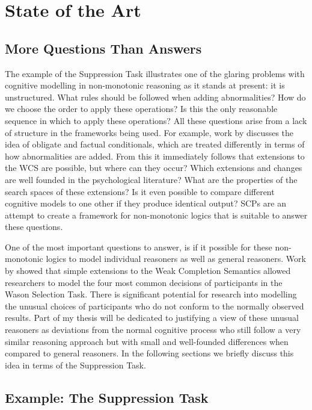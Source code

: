 \documentclass{article}
\begin{document}
\section{State of the Art}

\subsection{More Questions Than Answers}
The example of the Suppression Task \citep{byrne1989suppressing} illustrates one of the glaring problems with cognitive modelling in non-monotonic reasoning as it stands at present: it is unstructured. What rules should be followed when adding abnormalities? How do we choose the order to apply these operations? Is this the only reasonable sequence in which to apply these operations? All these questions arise from a lack of structure in the frameworks being used. For example, work by \cite{saldanha2017weak} discusses the idea of obligate and factual conditionals, which are treated differently in terms of how abnormalities are added. From this it immediately follows that extensions to the WCS are possible, but where can they occur? Which extensions and changes are well founded in the psychological literature? What are the properties of the search spaces of these extensions? Is it even possible to compare different cognitive models to one other if they produce identical output? SCPs are an attempt to create a framework for non-monotonic logics that is suitable to answer these questions.

One of the most important questions to answer, is if it possible for these non-monotonic logics to model individual reasoners as well as general reasoners. Work by \citep{breu2019weak} showed that simple extensions to the Weak Completion Semantics allowed researchers to model the four most common decisions of participants in the Wason Selection Task. There is significant potential for research into modelling the unusual choices of participants who do not conform to the normally observed results. Part of my thesis will be dedicated to justifying a view of these unusual reasoners as deviations from the normal cognitive process who still follow a very similar reasoning approach but with small and well-founded differences when compared to general reasoners. In the following sections we briefly discuss this idea in terms of the Suppression Task.

\subsection{Example: The Suppression Task}
\end{document}
